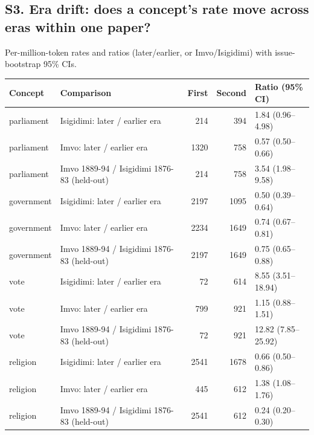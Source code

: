 \documentclass[10pt,letterpaper]{article}
\begin{document}
\subsection*{S3. Era drift: does a concept's rate move across eras within one paper?}
Per-million-token rates and ratios (later/earlier, or Imvo/Isigidimi) with issue-bootstrap 95\% CIs.\\[2pt]
\begin{tabular}{@{}llrrl@{}}
\toprule
Concept & Comparison & First & Second & Ratio (95\% CI) \\ \midrule
parliament & Isigidimi: later / earlier era & 214 & 394 & 1.84 (0.96--4.98) \\
parliament & Imvo: later / earlier era & 1320 & 758 & 0.57 (0.50--0.66) \\
parliament & Imvo 1889-94 / Isigidimi 1876-83 (held-out) & 214 & 758 & 3.54 (1.98--9.58) \\
government & Isigidimi: later / earlier era & 2197 & 1095 & 0.50 (0.39--0.64) \\
government & Imvo: later / earlier era & 2234 & 1649 & 0.74 (0.67--0.81) \\
government & Imvo 1889-94 / Isigidimi 1876-83 (held-out) & 2197 & 1649 & 0.75 (0.65--0.88) \\
vote & Isigidimi: later / earlier era & 72 & 614 & 8.55 (3.51--18.94) \\
vote & Imvo: later / earlier era & 799 & 921 & 1.15 (0.88--1.51) \\
vote & Imvo 1889-94 / Isigidimi 1876-83 (held-out) & 72 & 921 & 12.82 (7.85--25.92) \\
religion & Isigidimi: later / earlier era & 2541 & 1678 & 0.66 (0.50--0.86) \\
religion & Imvo: later / earlier era & 445 & 612 & 1.38 (1.08--1.76) \\
religion & Imvo 1889-94 / Isigidimi 1876-83 (held-out) & 2541 & 612 & 0.24 (0.20--0.30) \\
\bottomrule
\end{tabular}
\end{document}
